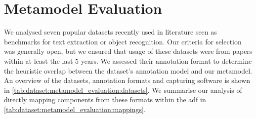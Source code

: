 \section{Metamodel Evaluation}
\label{sec:dataset:architecture_evaluation}

We analysed seven popular datasets recently used in literature seen as benchmarks for text extraction or object recognition. Our criteria for selection was generally open, but we ensured that usage of these datasets were from papers within at least the last 5 years. We assessed their annotation format to determine the heuristic overlap between the dataset's annotation model and our metamodel. An overview of the datasets, annotation formats and capturing software is shown in \cref{tab:dataset:metamodel_evaluation:datasets}. We summarise our analysis of directly mapping components from these formats within the \gls{adf} in \cref{tab:dataset:metamodel_evaluation:mappings}.


